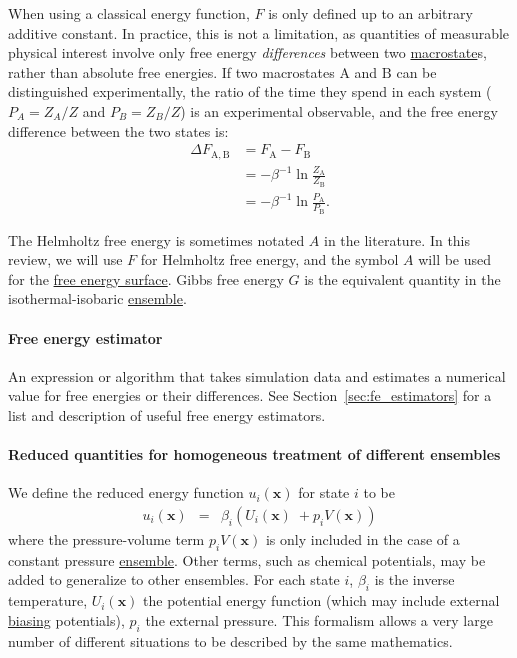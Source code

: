 \documentclass[9pt,review]{livecoms}
\newcommand{\vx}{\mathbf{x}}
\newcommand{\A}{\mathrm{A}}
\newcommand{\B}{\mathrm{B}}
\begin{document}
When using a classical energy function, $F$ is only defined up to an arbitrary additive constant.
In practice, this is not a limitation, as quantities of measurable physical interest involve only free energy \textit{differences} between two \hyperlink{ref:Macrostate} {macrostate}s, rather than absolute free energies.
If two macrostates $\A$ and $\B$ can be distinguished experimentally, the ratio of the time they spend in each system ($P_A = Z_A/Z$ and $P_B = Z_B/Z$) is an experimental observable, and the free energy difference between the two states is:
\begin{align}
  \Delta F_{\A,\B} &= F_{\A} - F_{\B} \nonumber\\
    & = -\beta^{-1} \ln \frac{Z_{\A}}{Z_{\B}} \nonumber\\
  & = -\beta^{-1} \ln \frac{P_{\A}}{P_{\B}}.
\end{align}

The Helmholtz free energy is sometimes notated $A$ in the literature. In this review, we will use $F$ for Helmholtz free energy, and the symbol $A$ will be used for the \hyperlink{ref:FES} {free energy surface}. Gibbs free energy $G$ is the equivalent quantity in the isothermal-isobaric \hyperlink{ref:Ensemble} {ensemble}.

\hypertarget{ref:FEestimator} {\paragraph{Free energy estimator}}
An expression or algorithm that takes simulation data and estimates a numerical value for free energies or their differences. See Section~\ref{sec:fe_estimators} for a list and description of useful free energy estimators.

\hypertarget{ref:reduced} {\paragraph{Reduced quantities for homogeneous treatment of different ensembles}}

We define the reduced energy function $u_i(\vx)$
for state $i$ to be
\begin{eqnarray}
u_i(\vx) &=& \beta_i ( U_i(\vx) \;
+ p_i V(\vx)) \label{equation:reduced-energy}
\end{eqnarray}
where the pressure-volume term $p_i V(\vx)$ is only included in the case of a constant pressure \hyperlink{ref:Ensemble} {ensemble}.
Other terms, such as chemical potentials, may be added to generalize to other ensembles.
For each state $i$, $\beta_i$ is the inverse temperature, $U_i(\vx)$ the potential energy function (which may include external \hyperlink{ref:biasingE} {biasing} potentials), $p_i$ the external pressure.
This formalism allows a very large number of different
situations to be described by the same mathematics.
\end{document}
